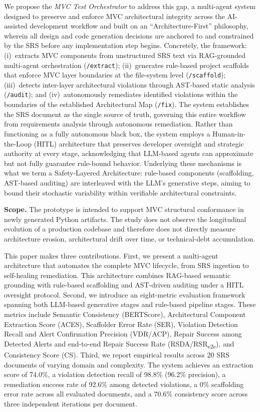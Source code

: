 We propose the \textit{MVC Test Orchestrator} to address this gap, a
multi-agent system designed to preserve and enforce MVC architectural
integrity across the AI-assisted development workflow and built on an
``Architecture-First'' philosophy, wherein all design and code
generation decisions are anchored to and constrained by the SRS before
any implementation step begins. Concretely, the framework: (i)~extracts
MVC components from unstructured SRS text via RAG-grounded multi-agent
orchestration (\texttt{/extract}); (ii)~generates rule-based project
scaffolds that enforce MVC layer boundaries at the file-system level
(\texttt{/scaffold}); (iii)~detects inter-layer architectural violations
through AST-based static analysis (\texttt{/audit}); and
(iv)~autonomously remediates identified violations within the boundaries
of the established Architectural Map (\texttt{/fix}). The system
establishes the SRS document as the single source of truth, governing
this entire workflow from requirements analysis through autonomous
remediation. Rather than functioning as a fully autonomous black box,
the system employs a Human-in-the-Loop (HITL) architecture that
preserves developer oversight and strategic authority at every stage,
acknowledging that LLM-based agents can approximate but not fully
guarantee rule-bound behavior. Underlying these mechanisms is what we
term a Safety-Layered Architecture: rule-based components (scaffolding,
AST-based auditing) are interleaved with the LLM's generative steps,
aiming to bound their stochastic variability within verifiable
architectural constraints.

\smallskip\noindent\textbf{Scope.} The prototype is intended to support MVC structural conformance in newly generated Python artifacts. The study does not observe the longitudinal evolution of a production codebase and therefore does not directly measure architecture erosion, architectural drift over time, or technical-debt accumulation.

This paper makes three contributions. First, we present a multi-agent
architecture that automates the complete MVC lifecycle, from SRS
ingestion to self-healing remediation. This architecture combines
RAG-based semantic grounding with rule-based scaffolding and AST-driven
auditing under a HITL oversight protocol. Second, we introduce an
eight-metric evaluation framework spanning both LLM-based generative
stages and rule-based pipeline stages. These metrics include Semantic
Consistency (BERTScore), Architectural Component Extraction Score
(ACES), Scaffolder Error Rate (SER), Violation Detection Recall and
Alert Confirmation Precision (VDR/ACP), Repair Success among Detected
Alerts and end-to-end Repair Success Rate (RSDA/RSR\textsubscript{e2e}), and
Consistency Score (CS). Third, we report empirical results across 20
SRS documents of varying domain and complexity. The system achieves an
extraction score of 74.0\%, a violation detection recall of 98.8\%
(96.2\% precision), a remediation success rate of 92.6\% among detected
violations, a 0\% scaffolding error rate across all evaluated
documents, and a 70.6\% consistency score across three independent
iterations per document.

